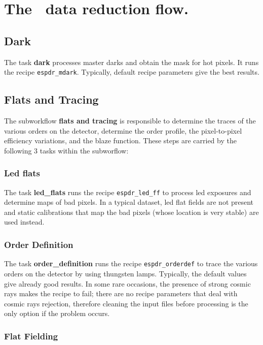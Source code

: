 \section{The \instname\ data reduction flow.}
\label{sec:reduction_flow}


\subsection{Dark}
The task {\bf dark} processes master darks and obtain the mask for hot pixels. It runs the recipe {\tt espdr\_mdark}. Typically, default recipe parameters give the best results. 

\subsection{Flats and Tracing}

The subworkflow {\bf flats and tracing} is responsible to determine
the traces of the various orders on the detector, determine the order
profile, the pixel-to-pixel efficiency variations, and the blaze
function. These steps are carried by the following 3 tasks within the
subworflow:
\subsubsection{Led flats}

The task {\bf led\_flats} runs the recipe {\tt espdr\_led\_ff} to
process led exposures and determine maps of bad pixels.  In a typical
dataset, led flat fields are not present and static calibrations that
map the bad pixels (whose location is very stable) are used instead.


\subsubsection{Order Definition}

The task {\bf order\_definition} runs the recipe {\tt espdr\_orderdef}
to trace the various orders on the detector by using thungsten
lamps. Typically, the default values give already good results. In
some rare occasions, the presence of strong cosmic rays makes the
recipe to fail; there are no recipe parameters that deal with cosmic
rays rejection, therefore cleaning the input files before processing
is the only option if the problem occurs.

\subsubsection{Flat Fielding}

